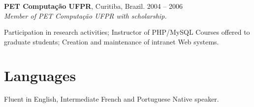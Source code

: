 \documentclass[margin,centered,10pt]{resume}
\begin{document}
\begin{resume}
    \textbf{PET Computação UFPR}, Curitiba, Brazil.
    \hfill 2004 – 2006\\
    \textsl{Member of PET Computação UFPR with scholarship.}
    \vspace{-3mm}\\\vspace{-1mm}%
    \begin{list2}
        \item Participation in research activities; Instructor of PHP/MySQL Courses offered to graduate students; Creation and maintenance of intranet Web systems.
    \end{list2}\vspace{-1.5mm}%


    \section{\mysidestyle Languages}
    Fluent in English, Intermediate French and Portuguese Native speaker.

\end{resume}
\end{document}
